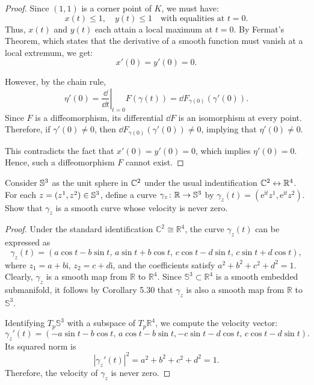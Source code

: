 \begin{problem}
\begin{proof}
        Since $(1,1)$ is a corner point of $K$, we must have:
        \[
        x(t) \leq 1, \quad y(t) \leq 1 \quad \text{with equalities at } t = 0.
        \]
        Thus, $x(t)$ and $y(t)$ each attain a local maximum at $t = 0$. By Fermat's Theorem, which states that the derivative of a smooth function must vanish at a local extremum, we get:
        \[
        x'(0) = y'(0) = 0.
        \]

        However, by the chain rule,
        \[
        \eta'(0) = \left. \frac{\dd}{\dd{t}} \right|_{t=0} F(\gamma(t)) = \dd{F}_{\gamma(0)}(\gamma'(0)).
        \]
        Since $F$ is a diffeomorphism, its differential $\dd{F}$ is an isomorphism at every point. Therefore, if $\gamma'(0) \ne 0$, then $\dd{F}_{\gamma(0)}(\gamma'(0)) \ne 0$, implying that $\eta'(0) \ne 0$.

        This contradicts the fact that $x'(0) = y'(0) = 0$, which implies $\eta'(0) = 0$. Hence, such a diffeomorphism $F$ cannot exist.
    \end{proof}
\end{problem}

\begin{problem}
    Consider $\mathbb{S}^3$ as the unit sphere in $\mathbb{C}^2$ under the usual indentification $\mathbb{C}^2 \leftrightarrow \mathbb{R}^4$. For each $z = (z^1, z^2) \in \mathbb{S}^3$, define a curve $\gamma_z \colon \mathbb{R} \to \mathbb{S}^3$ by $\gamma_z(t) = (\mathrm{e}^{\mathrm{i}t}z^1, \mathrm{e}^{\mathrm{i}t}z^2)$. Show that $\gamma_z$ is a smooth curve whose velocity is never zero.
    \begin{proof}
        Under the standard identification \( \mathbb{C}^2 \cong \mathbb{R}^4 \), the curve \( \gamma_z(t) \) can be expressed as
        \[
        \gamma_z(t) = (a\cos t - b\sin t,\, a\sin t + b\cos t,\, c\cos t - d\sin t,\, c\sin t + d\cos t),
        \]
        where \( z_1 = a + b\mathrm{i} \), \( z_2 = c + d\mathrm{i} \), and the coefficients satisfy \( a^2 + b^2 + c^2 + d^2 = 1 \). Clearly, \( \gamma_z \) is a smooth map from \( \mathbb{R} \) to \( \mathbb{R}^4 \). Since \( \mathbb{S}^3 \subset \mathbb{R}^4 \) is a smooth embedded submanifold, it follows by Corollary 5.30 that \( \gamma_z \) is also a smooth map from \( \mathbb{R} \) to \( \mathbb{S}^3 \).

        Identifying \( T_p\mathbb{S}^3 \) with a subspace of \( T_p\mathbb{R}^4 \), we compute the velocity vector:
        \[
        \gamma_z'(t) = (-a\sin t - b\cos t,\, a\cos t - b\sin t, -c\sin t - d\cos t,\, c\cos t - d\sin t).
        \]
        Its squared norm is
        \[
        |\gamma_z'(t)|^2 = a^2 + b^2 + c^2 + d^2 = 1.
        \]
        Therefore, the velocity of \( \gamma_z \) is never zero.
    \end{proof}
\end{problem}

